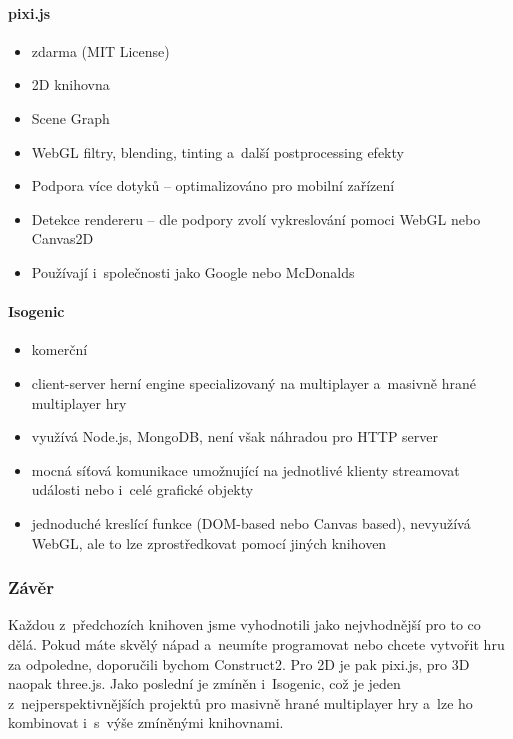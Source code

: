 \documentclass[12pt,a4paper,titlepage,final]{report}
\begin{document}
\paragraph{pixi.js} \cite{pixi}

\begin{itemize}
	\item zdarma (MIT License)
	\item 2D knihovna
	\item Scene Graph
	\item WebGL filtry, blending, tinting a~další postprocessing efekty
	\item Podpora více dotyků -- optimalizováno pro mobilní zařízení
	\item Detekce rendereru -- dle podpory zvolí vykreslování pomoci WebGL nebo Canvas2D
	\item Používají i~společnosti jako Google nebo McDonalds
\end{itemize}

\paragraph{Isogenic} \cite{isogenic}

\begin{itemize}
	\item komerční
	\item client-server herní engine specializovaný na multiplayer a~masivně hrané multiplayer hry
	\item využívá Node.js, MongoDB, není však náhradou pro HTTP server
	\item mocná síťová komunikace umožnující na jednotlivé klienty streamovat události nebo i~celé grafické objekty
	\item jednoduché kreslící funkce (DOM-based nebo Canvas based), nevyužívá WebGL, ale to lze zprostředkovat pomocí jiných knihoven
\end{itemize}

\subsubsection{Závěr}

Každou z~předchozích knihoven jsme vyhodnotili jako nejvhodnější pro to co dělá. Pokud máte skvělý nápad a~neumíte programovat nebo chcete vytvořit hru za odpoledne, doporučili bychom Construct2. Pro 2D je pak pixi.js, pro 3D naopak three.js. Jako poslední je zmíněn i~Isogenic, což je jeden z~nejperspektivnějších projektů pro masivně hrané multiplayer hry a~lze ho kombinovat i~s~výše zmíněnými knihovnami.
\end{document}

